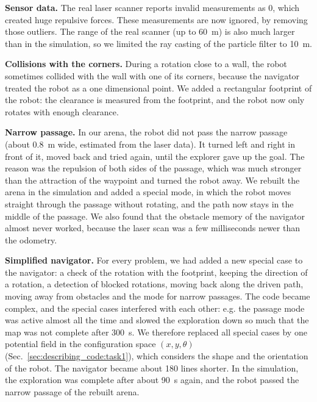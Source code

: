 \documentclass[../report.tex]{subfiles}
\begin{document}

    \textbf{Sensor data.}
    The real laser scanner reports invalid measurements as 0, which created huge repulsive forces. These measurements are now ignored, by removing those outliers. The range of the real scanner (up to \SI{60}{m}) is also much larger than in the simulation, so we limited the ray casting of the particle filter to \SI{10}{m}.

    \textbf{Collisions with the corners.}
    During a rotation close to a wall, the robot sometimes collided with the wall with one of its corners, because the navigator treated the robot as a one dimensional point.
    We added a rectangular footprint of the robot: the clearance is measured from the footprint, and the robot now only rotates with enough clearance.

    \textbf{Narrow passage.}
    In our arena, the robot did not pass the narrow passage (about \SI{0.8}{m} wide, estimated from the laser data).
    It turned left and right in front of it, moved back and tried again, until the explorer gave up the goal.
    The reason was the repulsion of both sides of the passage, which was much stronger than the attraction of the waypoint and turned the robot away.
    We rebuilt the arena in the simulation and added a special mode, in which the robot moves straight through the passage without rotating, and the path now stays in the middle of the passage.
    We also found that the obstacle memory of the navigator almost never worked, because the laser scan was a few milliseconds newer than the odometry.

    \textbf{Simplified navigator.}
    For every problem, we had added a new special case to the navigator: a check of the rotation with the footprint, keeping the direction of a rotation, a detection of blocked rotations, moving back along the driven path, moving away from obstacles and the mode for narrow passages.
    The code became complex, and the special cases interfered with each other: e.g. the passage mode was active almost all the time and slowed the exploration down so much that the map was not complete after \SI{300}{s}.
    We therefore replaced all special cases by one potential field in the configuration space $(x, y, \theta)$ (Sec.~\ref{sec:describing_code:task1}), which considers the shape and the orientation of the robot.
    The navigator became about 180 lines shorter. In the simulation, the exploration was complete after about \SI{90}{s} again, and the robot passed the narrow passage of the rebuilt arena.
\end{document}
